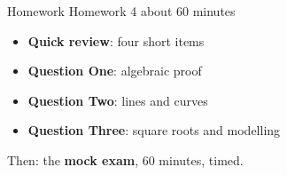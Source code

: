 \documentclass[aspectratio=169,11pt,xcolor=table,t]{beamer}
\begin{document}
\begin{frame}{Homework}
\relax
Homework 4 \textperiodcentered{} about 60 minutes
\begin{itemize}
\item \textbf{Quick review}: four short items
\item \textbf{Question One}: algebraic proof
\item \textbf{Question Two}: lines and curves
\item \textbf{Question Three}: square roots and modelling
\end{itemize}
Then: the \textbf{mock exam}, 60 minutes, timed.
\end{frame}
\end{document}
